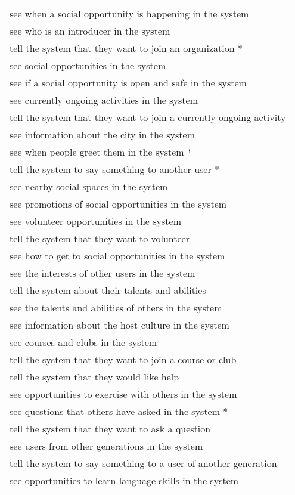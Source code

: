 \begin{longtable}{p{}}
see when a social opportunity is happening in the system \\
see who is an introducer in the system \\
tell the system that they want to join an organization  * \\
see social opportunities in the system \\
see if a social opportunity is open and safe in the system \\
see currently ongoing activities in the system \\
tell the system that they want to join a currently ongoing activity \\
see information about the city in the system \\
see when people greet them in the system  * \\
tell the system to say something to another user  * \\
see nearby social spaces in the system \\
see promotions of social opportunities in the system \\
see volunteer opportunities in the system \\
tell the system that they want to volunteer \\
see how to get to social opportunities in the system \\
see the interests of other users in the system \\
tell the system about their talents and abilities \\
see the talents and abilities of others in the system \\
see information about the host culture in the system \\
see courses and clubs in the system \\
tell the system that they want to join a course or club \\
tell the system that they would like help \\
see opportunities to exercise with others in the system \\
see questions that others have asked in the system  * \\
tell the system that they want to ask a question \\
see users from other generations in the system \\
tell the system to say something to a user of another generation \\
see opportunities to learn language skills in the system \\

\end{longtable}
